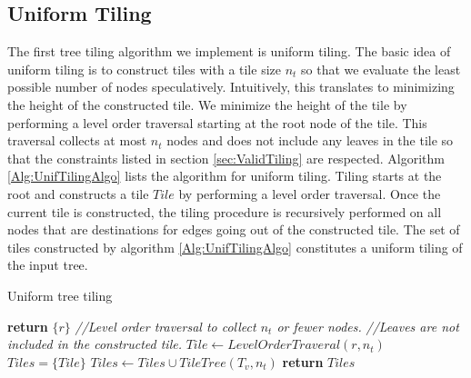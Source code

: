 \subsection{Uniform Tiling}
\label{sec:UnifTiling}
The first tree tiling algorithm we implement is uniform tiling. The basic idea of uniform tiling is to construct tiles
with a tile size $n_t$ so that we evaluate 
the least possible number of nodes speculatively. Intuitively, this translates to minimizing the height of the constructed tile. We minimize
the height of the tile by performing a level order traversal starting at the root node of the tile. 
This traversal collects at most $n_t$ nodes
and does not include any leaves in the tile so that the constraints listed in section \ref{sec:ValidTiling} are respected. Algorithm 
\ref{Alg:UnifTilingAlgo} lists the algorithm for uniform tiling. Tiling starts at the root and constructs a tile $Tile$ by performing
a level order traversal. Once the current tile is constructed, the tiling procedure is recursively performed on all nodes that are 
destinations for edges going out of the constructed tile. The set of tiles constructed by algorithm \ref{Alg:UnifTilingAlgo} constitutes 
a uniform tiling of the input tree.
\begin{algorithm}
  \caption{Uniform tree tiling}
  \label{Alg:UnifTilingAlgo}
  \begin{algorithmic}
              \State \textbf{return} $\{ r \}$
          \EndIf
          \State \textcolor{codegreen}{\textit{//Level order traversal to collect $n_t$ or fewer nodes. }}
          \State \textcolor{codegreen}{\textit{//Leaves are not included in the constructed tile. }}
          \State $Tile \leftarrow LevelOrderTraveral(r, n_t)$
          \State $Tiles =  \{ Tile \}$
              \State $Tiles \leftarrow Tiles \cup TileTree(T_v, n_t)$
          \EndFor
          \State \textbf{return} $Tiles$
      \EndProcedure
  \end{algorithmic}
\end{algorithm}


